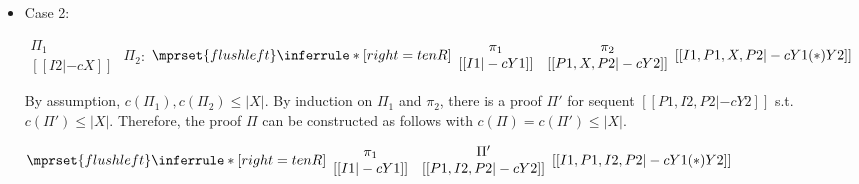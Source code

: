 \begin{itemize}
\item Case 2:
      \begin{center}
        \scriptsize
        \begin{math}
          \begin{array}{c}
            \Pi_1 \\
            {[[I2 |-c X]]}
          \end{array}
        \end{math}
        \qquad\qquad
        $\Pi_2$:
        \begin{math}
          $$\mprset{flushleft}
          \inferrule* [right={\tiny tenR}] {
            {
              \begin{array}{cc}
                \pi_1 & \pi_2 \\
                {[[I1 |-c Y1]]} & {[[P1, X, P2 |-c Y2]]}
              \end{array}
            }
          }{[[I1, P1, X, P2 |-c Y1 (*) Y2]]}
        \end{math}
      \end{center}
      By assumption, $c(\Pi_1),c(\Pi_2)\leq |X|$. By induction on $\Pi_1$
      and $\pi_2$, there is a proof $\Pi'$ for sequent
      $[[P1, I2, P2 |-c Y2]]$ s.t. $c(\Pi') \leq |X|$. Therefore, the proof
      $\Pi$ can be constructed as follows with $c(\Pi) = c(\Pi') \leq |X|$.
      \begin{center}
        \scriptsize
        \begin{math}
          $$\mprset{flushleft}
          \inferrule* [right={\tiny tenR}] {
            {
              \begin{array}{cc}
                \pi_1 & \Pi' \\
                {[[I1 |-c Y1]]} & {[[P1, I2, P2 |-c Y2]]}
              \end{array}
            }
          }{[[I1, P1, I2, P2 |-c Y1 (*) Y2]]}
        \end{math}
      \end{center}
\end{itemize}



